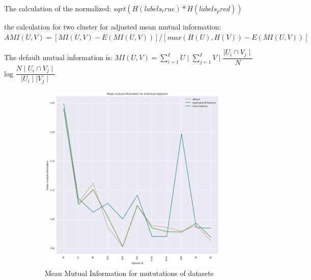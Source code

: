 \documentclass[a4paper,10pt]{article}
\begin{document}
The calculation of the normalized:
$sqrt(H(labels_true) * H(labels_pred))$


the calculation for two cluster for adjusted mean mutual information:
$AMI(U, V) = [MI(U, V) - E(MI(U, V))] / [max(H(U), H(V)) - E(MI(U, V))]$


The default mutual information is:
$MI(U,V) = \sum_{i = 1}^{I} U \mid\sum_{j = 1}^{I} V \mid \dfrac{\mid U_i \cap V_j\mid}{N} $log $\dfrac{N\mid U_i \cap V_j\mid}{\mid U_i\mid \mid V_j\mid}$

\begin{figure}[H]
	\centering
	\begin{subfigure}[b]{0.45\textwidth}
		\includegraphics[width=\textwidth]{images/MeanMutualInformation.png}
		\caption{Mean Mutual Information for mututations of datasets}
		\label{fig:MMI}
	\end{subfigure}
	\begin{subfigure}[b]{0.45\textwidth}

\end{subfigure}
\end{figure}
\end{document}

